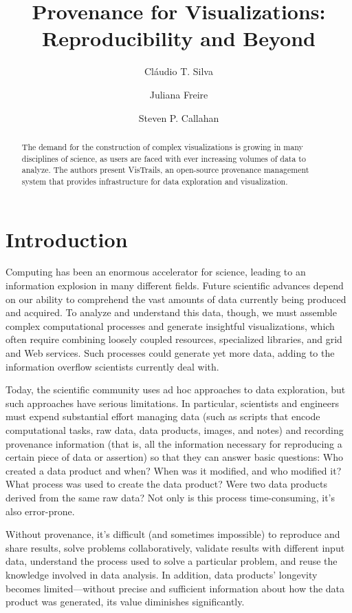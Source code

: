 \documentclass[11pt,twocolumn]{article}
\begin{document}
\title{%
Provenance for Visualizations: Reproducibility and Beyond}
\author{Cl\'audio T. Silva \and Juliana Freire \and Steven P. Callahan}

\maketitle

\begin{abstract}
  The demand for the construction of complex visualizations is growing
  in many disciplines of science, as users are faced with ever
  increasing volumes of data to analyze. The authors present
  VisTrails, an open-source provenance management system that provides
  infrastructure for data exploration and visualization.
\end{abstract}

\section{Introduction}
Computing has been an enormous accelerator for science, leading to an
information explosion in many different fields. Future scientific
advances depend on our ability to comprehend the vast amounts of
data currently being produced and acquired. 
%
To analyze and understand this data, though, we must assemble complex
computational processes and generate insightful visualizations, which
often require combining loosely coupled resources, specialized
libraries, and grid and Web services. Such processes could generate
yet more data, adding to the information overflow scientists currently
deal with.  


Today, the scientific community uses ad hoc approaches to
data exploration, but such approaches have serious limitations. In
particular, scientists and engineers must expend substantial effort
managing data (such as scripts that encode computational tasks, raw
data, data products, images, and notes) and recording provenance
information (that is, all the information necessary for reproducing a
certain piece of data or assertion) so that they can answer basic
questions: Who created a data product and when? When was it modified,
and who modified it? What process was used to create the data product?
Were two data products derived from the same raw data? Not only is
this process time-consuming, it’s also error-prone.  

Without provenance, it’s difficult (and sometimes impossible) to
reproduce and share results, solve problems collaboratively, validate
results with different input data, understand the process used to
solve a particular problem, and reuse the knowledge involved in data
analysis. In addition, data products’ longevity becomes
limited—without precise and sufficient information about how the data
product was generated, its value diminishes significantly.  
\end{document}
